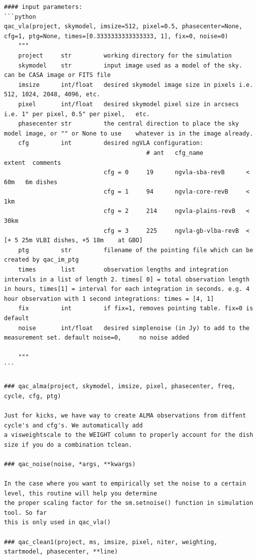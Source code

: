 \documentclass[11pt,twoside]{article}
\begin{document}
\begin{verbatim}
#### input parameters:
```python
qac_vla(project, skymodel, imsize=512, pixel=0.5, phasecenter=None, cfg=1, ptg=None, times=[0.3333333333333333, 1], fix=0, noise=0)
    """
    project     str         working directory for the simulation
    skymodel    str         input image used as a model of the sky. can be CASA image or FITS file
    imsize      int/float   desired skymodel image size in pixels i.e. 512, 1024, 2048, 4096, etc.
    pixel       int/float   desired skymodel pixel size in arcsecs i.e. 1" per pixel, 0.5" per pixel,   etc.
    phasecenter str         the central direction to place the sky model image, or "" or None to use    whatever is in the image already.
    cfg         int         desired ngVLA configuration:
                                        # ant   cfg_name            extent  comments
                            cfg = 0     19      ngvla-sba-revB      < 60m   6m dishes
                            cfg = 1     94      ngvla-core-revB     < 1km
                            cfg = 2     214     ngvla-plains-revB   < 30km 
                            cfg = 3     225     ngvla-gb-vlba-revB  <       [+ 5 25m VLBI dishes, +5 18m    at GBO]
    ptg         str         filename of the pointing file which can be created by qac_im_ptg
    times       list        observation lengths and integration intervals in a list of length 2. times[ 0] = total observation length in hours, times[1] = interval for each integration in seconds. e.g. 4  hour observation with 1 second integrations: times = [4, 1]
    fix         int         if fix=1, removes pointing table. fix=0 is default
    noise       int/float   desired simplenoise (in Jy) to add to the measurement set. default noise=0,     no noise added
    
    """
```

### qac_alma(project, skymodel, imsize, pixel, phasecenter, freq, cycle, cfg, ptg)

Just for kicks, we have way to create ALMA observations from diffent cycle's and cfg's. We automatically add
a visweightscale to the WEIGHT column to properly account for the dish size if you do a combination tclean.

### qac_noise(noise, *args, **kwargs)

In the case where you want to empirically set the noise to a certain level, this routine will help you determine
the proper scaling factor for the sm.setnoise() function in simulation tool. So far
this is only used in qac_vla()

### qac_clean1(project, ms, imsize, pixel, niter, weighting, startmodel, phasecenter, **line)


\end{verbatim}
\end{document}
